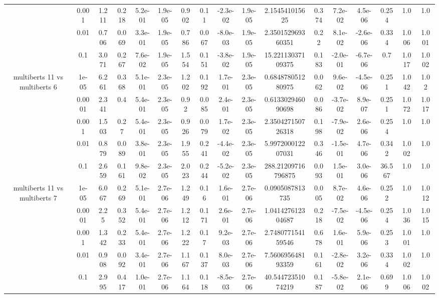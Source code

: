 \begin{tabular}{|c|c|c|c|c|c|c|c|c|c|c|c|c|c|c|c|c|}
 & 0.001 & 1.211 & 0.218 & 5.2e-01 & 1.9e-05 & 0.902 & 0.11 & -2.3e-02 & 1.9e-05 & 2.154541015625 & 0.374 & 7.2e-02 & 4.5e-06 & 0.254 & 1.0 & 1.0 \\
 & 0.01 & 0.706 & 0.069 & 3.3e-01 & 1.9e-05 & 0.786 & 0.067 & -8.0e-03 & 1.9e-05 & 2.350152969360351 & 0.22 & 8.1e-02 & -2.6e-06 & 0.334 & 1.006 & 1.001 \\
 & 0.1 & 3.071 & 0.267 & 7.6e-02 & 1.9e-05 & 1.554 & 0.151 & -3.8e-02 & 1.9e-05 & 15.22113037109375 & 0.183 & -2.0e-01 & -6.7e-06 & 0.7 & 1.017 & 1.002 \\
\hline
\multirow{5}{*}{multiberts 11 vs multiberts 6} & 1e-05 & 6.261 & 0.368 & 5.1e-01 & 2.3e-05 & 1.202 & 0.192 & 1.7e-01 & 2.3e-05 & 0.684878051280975 & 0.062 & 9.6e-02 & -4.5e-06 & 0.251 & 1.042 & 1.02 \\
 & 0.0001 & 2.341 & 0.4 & 5.4e-01 & 2.3e-05 & 0.92 & 0.085 & 2.4e-01 & 2.3e-05 & 0.613302946090698 & 0.086 & -3.7e-02 & 8.9e-07 & 0.251 & 1.072 & 1.017 \\
 & 0.001 & 1.503 & 0.27 & 5.4e-01 & 2.3e-05 & 0.926 & 0.079 & 1.7e-02 & 2.3e-05 & 2.350427150726318 & 0.198 & -7.9e-02 & 2.6e-06 & 0.254 & 1.0 & 1.0 \\
 & 0.01 & 0.879 & 0.089 & 3.8e-01 & 2.3e-05 & 1.955 & 0.241 & -4.4e-02 & 2.3e-05 & 5.997200012207031 & 0.346 & -1.5e-01 & 4.7e-06 & 0.342 & 1.002 & 1.0 \\
 & 0.1 & 2.659 & 0.161 & 9.8e-02 & 2.3e-05 & 2.023 & 0.244 & -5.2e-02 & 2.3e-05 & 288.21209716796875 & 0.093 & 1.5e-01 & 3.0e-06 & 36.567 & 1.0 & 1.0 \\
\hline
\multirow{5}{*}{multiberts 11 vs multiberts 7} & 1e-05 & 6.067 & 0.269 & 5.1e-01 & 2.7e-06 & 1.249 & 0.16 & 1.6e-01 & 2.7e-06 & 0.0905087813735 & 0.005 & 8.7e-02 & 4.6e-06 & 0.252 & 1.0 & 1.012 \\
 & 0.0001 & 2.25 & 0.352 & 5.4e-01 & 2.7e-06 & 1.212 & 0.171 & 2.6e-01 & 2.7e-06 & 1.041427612304687 & 0.218 & -7.5e-02 & -4.5e-06 & 0.254 & 1.036 & 1.015 \\
 & 0.001 & 1.342 & 0.233 & 5.4e-01 & 2.7e-06 & 1.222 & 0.17 & 9.2e-03 & 2.7e-06 & 2.748077154159546 & 0.678 & 1.6e-01 & 5.9e-06 & 0.253 & 1.001 & 1.0 \\
 & 0.01 & 0.908 & 0.092 & 3.4e-01 & 2.7e-06 & 1.167 & 0.137 & 8.0e-03 & 2.7e-06 & 7.560695648193359 & 0.161 & -2.8e-02 & 3.2e-06 & 0.334 & 1.002 & 1.0 \\
 & 0.1 & 2.995 & 0.417 & 1.0e-01 & 2.7e-06 & 1.164 & 0.118 & -8.5e-03 & 2.7e-06 & 40.54472351074219 & 0.187 & -5.8e-02 & 2.1e-06 & 0.699 & 1.006 & 1.002 \\

\end{tabular}
